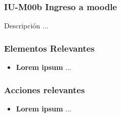 
\subsubsection{IU-M00b Ingreso a moodle}

 Descripción ...


\subsubsection{Elementos Relevantes}

    \begin{itemize}
    \item {\bf Lorem ipsum}
        ...
    \end{itemize}

\subsubsection{Acciones relevantes}

    \begin{itemize}
    \item {\bf Lorem ipsum}
        ...
    \end{itemize}

\clearpage

